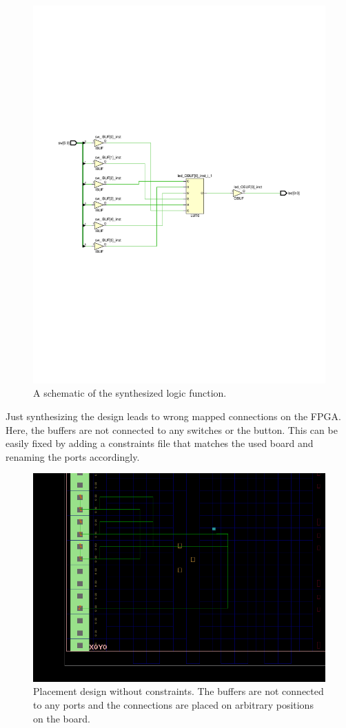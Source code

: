 \begin{figure}
	\centering
	\includegraphics[width=\linewidth, trim=0mm 90mm 0mm 90mm]{./L1/E2/schematic.pdf}
	\caption{A schematic of the synthesized logic function.}
	\label{fig: schematic e_1_2_3}
\end{figure}

Just synthesizing the design leads to wrong mapped connections on the FPGA. Here, the buffers are not connected to any switches or the button. This can be easily fixed by adding a constraints file that matches the used board and renaming the ports accordingly.

\begin{figure}
	\centering
	\includegraphics[width=.8\linewidth]{./L1/E2/step5}
	\caption{Placement design without constraints. The buffers are not connected to any ports and the connections are placed on arbitrary positions on the board.}
	\label{fig: placement without constraints e_1_2_4}
\end{figure}

